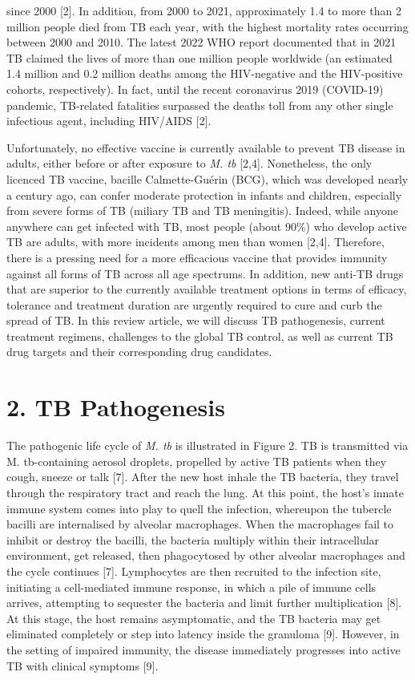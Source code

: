 \documentclass{article}
\begin{document}
since 2000 [2]. In addition, from 2000 to 2021, approximately 1.4 to more than 2 million people died from TB each year, with the highest mortality rates occurring between 2000 and 2010. The latest 2022 WHO report documented that in 2021 TB claimed the lives of more than one million people worldwide (an estimated 1.4 million and 0.2 million deaths among the HIV-negative and the HIV-positive cohorts, respectively). In fact, until the recent coronavirus 2019 (COVID-19) pandemic, TB-related fatalities surpassed the deaths toll from any other single infectious agent, including HIV/AIDS [2].

Unfortunately, no effective vaccine is currently available to prevent TB disease in adults, either before or after exposure to \textit{M. tb} [2,4]. Nonetheless, the only licenced TB vaccine, bacille Calmette-Guérin (BCG), which was developed nearly a century ago, can confer moderate protection in infants and children, especially from severe forms of TB (miliary TB and TB meningitis). Indeed, while anyone anywhere can get infected with TB, most people (about 90\%) who develop active TB are adults, with more incidents among men than women [2,4]. Therefore, there is a pressing need for a more efficacious vaccine that provides immunity against all forms of TB across all age spectrums. In addition, new anti-TB drugs that are superior to the currently available treatment options in terms of efficacy, tolerance and treatment duration are urgently required to cure and curb the spread of TB. In this review article, we will discuss TB pathogenesis, current treatment regimens, challenges to the global TB control, as well as current TB drug targets and their corresponding drug candidates.

\section{\textbf{2. TB Pathogenesis}}

The pathogenic life cycle of \textit{M. tb} is illustrated in Figure 2. TB is transmitted via M. tb-containing aerosol droplets, propelled by active TB patients when they cough, sneeze or talk [7]. After the new host inhale the TB bacteria, they travel through the respiratory tract and reach the lung. At this point, the host's innate immune system comes into play to quell the infection, whereupon the tubercle bacilli are internalised by alveolar macrophages. When the macrophages fail to inhibit or destroy the bacilli, the bacteria multiply within their intracellular environment, get released, then phagocytosed by other alveolar macrophages and the cycle continues [7]. Lymphocytes are then recruited to the infection site, initiating a cell-mediated immune response, in which a pile of immune cells arrives, attempting to sequester the bacteria and limit further multiplication [8]. At this stage, the host remains asymptomatic, and the TB bacteria may get eliminated completely or step into latency inside the granuloma [9]. However, in the setting of impaired immunity, the disease immediately progresses into active TB with clinical symptoms [9].
\end{document}
